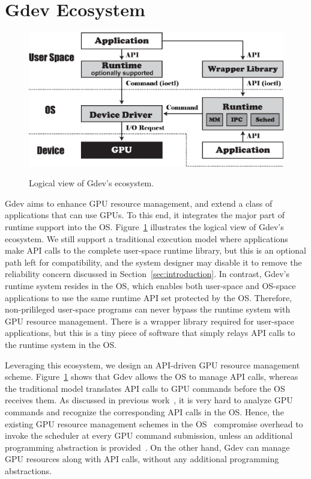 \vspace{-0.25em}
\section{Gdev Ecosystem}
\label{sec:ecosystem}
\vspace{-0.25em}

\begin{figure}[t]
 \begin{center}
  \includegraphics[width=\hsize]{eps/gdev.eps}\\
  \vspace{-0.5em}
  \caption{Logical view of Gdev's ecosystem.}
  \label{fig:gdev}
 \end{center}
 \vspace{-1.5em}
\end{figure}

Gdev aims to enhance GPU resource management, and extend a class
of applications that can use GPUs.
To this end, it integrates the major part of runtime support into the OS.
Figure~\ref{fig:gdev} illustrates the logical view of Gdev's ecosystem.
We still support a traditional execution model where applications make
API calls to the complete user-space runtime library, but this is an
optional path left for compatibility, and the system designer may
disable it to remove the reliability concern discussed in
Section~\ref{sec:introduction}.
In contrast, Gdev's runtime system resides in the OS, which enables both
user-space and OS-space applications to use the same runtime API set
protected by the OS.
Therefore, non-prilileged user-space programs can never bypass the
runtime system with GPU resource management.
There is a wrapper library required for user-space applications, but this is a
tiny piece of software that simply relays API calls to the runtime
system in the OS.

Leveraging this ecosystem, we design an API-driven GPU resource
management scheme.
Figure~\ref{fig:gdev} shows that Gdev allows the OS to manage
API calls, whereas the traditional model translates API calls to GPU
commands before the OS receives them.
As discussed in previous work~\cite{Kato_ATC11}, it is very hard to
analyze GPU commands and recognize the corresponding API calls in the
OS.
Hence, the existing GPU resource management schemes in the
OS~\cite{Bautin_MCNC08, Kato_ATC11} compromise overhead to invoke the
scheduler at every GPU command submission, unless an additional
programming abstraction is provided~\cite{Rossbach_SOSP11}.
On the other hand, Gdev can manage GPU resources along with API calls,
without any additional programming abstractions.

